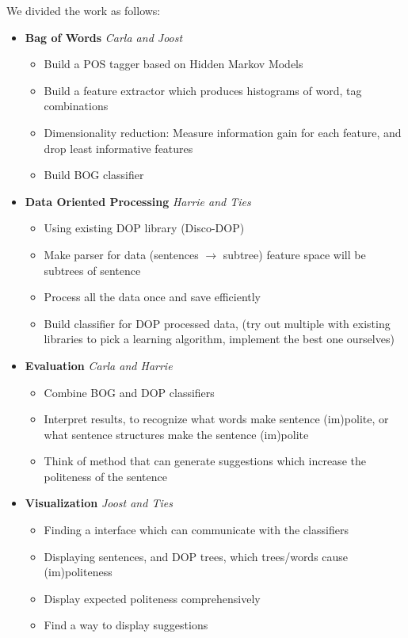 \documentclass[11pt, english]{article}
\begin{document}
We divided the work as follows:
\begin{itemize}
\item \textbf{Bag of Words} \emph{Carla and Joost}
	\begin{itemize}
		\item Build a POS tagger based on Hidden Markov Models
		\item Build a feature extractor which produces histograms of word, tag combinations
		\item Dimensionality reduction: Measure information gain for each feature, and drop least informative features
		\item Build BOG classifier
	\end{itemize}

\item \textbf{Data Oriented Processing} \emph{Harrie and Ties}
	\begin{itemize}
		\item Using existing DOP library (Disco-DOP)
		\item Make parser for data (sentences $\rightarrow$ subtree) feature space will be subtrees of sentence
		\item Process all the data once and save efficiently
		\item Build classifier for DOP processed data, (try out multiple with existing libraries to pick a learning algorithm, implement the best one ourselves)
	\end{itemize}

\item \textbf{Evaluation} \emph{Carla and Harrie}
	\begin{itemize}
		\item Combine BOG and DOP classifiers
		\item Interpret results, to recognize what words make sentence (im)polite, or what sentence structures make the sentence (im)polite
		\item Think of method that can generate suggestions which increase the politeness of the sentence
	\end{itemize}

\item \textbf{Visualization} \emph{Joost and Ties}
	\begin{itemize}
		\item Finding a interface which can communicate with the classifiers
		\item Displaying sentences, and DOP trees, which trees/words cause (im)politeness
		\item Display expected politeness comprehensively
		\item Find a way to display suggestions
	\end{itemize}

\end{itemize}
\end{document}
